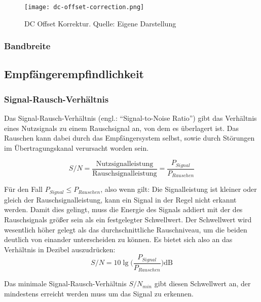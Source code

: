 \begin{figure}[ht]
	\centering
	\texttt{[image: dc-offset-correction.png]}
	\caption[DC Offset Korrektur]{DC Offset Korrektur. Quelle: Eigene Darstellung} 
	\label{dc-offset-correction}
\end{figure}


\subsubsection{Bandbreite}



\subsection{Empfängerempfindlichkeit}
\subsubsection{Signal-Rausch-Verhältnis}
Das Signal-Rausch-Verhältnis (engl.: \enquote{Signal-to-Noise Ratio}) gibt das Verhältnis eines Nutzsignals 
zu einem Rauschsignal an, von dem es überlagert ist. Das Rauschen kann dabei durch das Empfängersystem selbst, 
sowie durch Störungen im Übertragungskanal verursacht worden sein. %

\[ S/N = \frac{\text{Nutzsignalleistung}}{\text{Rauschsignalleistung}} = \frac{P_{Signal}}{P_{Rauschen}} \]


Für den Fall \(P_{Signal} \leq P_{Rauschen}\), also wenn gilt: 
Die Signalleistung ist kleiner oder gleich der Rauschsignalleistung, kann ein Signal in der Regel nicht erkannt werden.
Damit dies gelingt, muss die Energie des Signals addiert mit der des Rauschsignals größer sein als ein festgelegter Schwellwert.
Der Schwellwert wird wesentlich höher gelegt als das durchschnittliche Rauschniveau, um die beiden deutlich von einander unterscheiden zu können.
Es bietet sich also an das Verhältnis in Dezibel auszudrücken:
\[ S/N = 10 \lg \Big( \frac{P_{Signal}}{P_{Rauschen}} \Big) \text{dB}\] 



Das minimale Signal-Rausch-Verhältnis \(S/N_{min}\) gibt diesen Schwellwert an, der mindestens erreicht werden muss um das Signal zu erkennen. 

